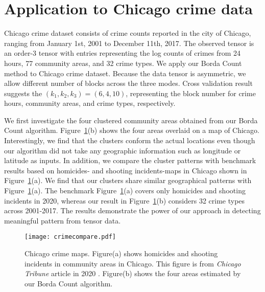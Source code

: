 \documentclass{article}
\theoremstyle{definition}
\begin{document}
\vspace{-.2cm}
\section{Application to Chicago crime data}\label{sec:app}
\vspace{-.2cm}
 Chicago crime dataset consists of crime counts reported in the city of Chicago, ranging from January 1st, 2001 to December 11th, 2017. The observed tensor is an order-3 tensor with entries representing the log counts of crimes from 24 hours, 77 community areas, and 32 crime types. We apply our Borda Count method to Chicago crime dataset. Because the data tensor is asymmetric, we allow different number of blocks across the three modes. Cross validation result suggests the $(k_1,k_2,k_3)=(6,4,10)$, representing the block number for crime hours, community areas, and crime types, respectively.

We first investigate the four clustered community areas obtained from our Borda Count algorithm.  Figure~\ref{fig:area}(b) shows the four areas overlaid on a map of Chicago. Interestingly, we find that the clusters conform the actual locations even though our algorithm did not take any geographic information such as longitude or latitude as inputs. In addition, we compare the cluster patterns with benchmark results based on homicides- and shooting incidents-maps in Chicago shown in Figure~\ref{fig:area}(a). We find that our clusters share similar geographical patterns with Figure~\ref{fig:area}(a). The benchmark Figure~\ref{fig:area}(a) covers only homicides and shooting incidents in 2020, whereas our result in Figure~\ref{fig:area}(b) considers 32 crime types across 2001-2017. The results demonstrate the power of our approach in detecting meaningful pattern from tensor data. 
\begin{figure}[h]
    \centering
    \texttt{[image: crimecompare.pdf]}
    \caption{Chicago crime maps. Figure(a) shows homicides and shooting incidents in community areas in Chicago. This figure is from \textit{Chicago Tribune} article in 2020 \citep{Jeremy.2020}. Figure(b) shows the four areas estimated by our Borda Count algorithm. }
    \label{fig:area}
    \vspace{-.4cm}
\end{figure}
\end{document}
